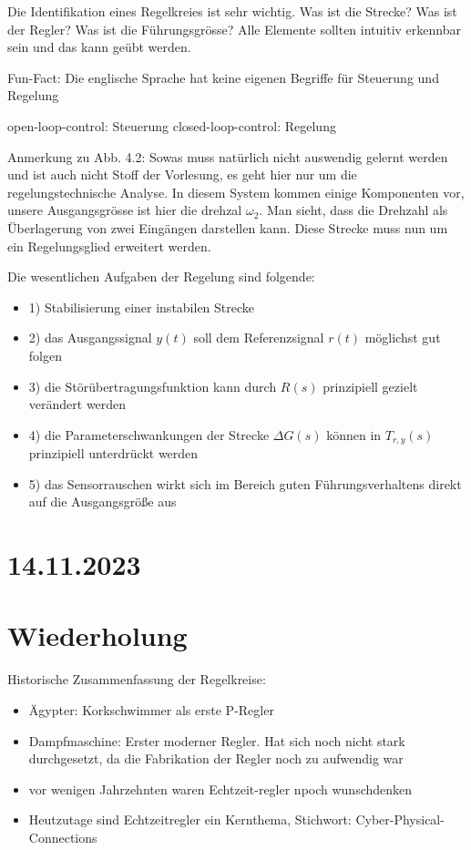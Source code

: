 \documentclass[a4paper]{article}
\begin{document}
Die Identifikation eines Regelkreies ist sehr wichtig. Was ist die Strecke? Was ist der Regler? Was ist die Führungsgrösse? Alle Elemente sollten intuitiv erkennbar sein und das kann geübt werden.

Fun-Fact: Die englische Sprache hat keine eigenen Begriffe für Steuerung und Regelung
\begin{iteimize}
    open-loop-control: Steuerung
    closed-loop-control: Regelung
\end{iteimize}

Anmerkung zu Abb. 4.2: Sowas muss natürlich nicht auswendig gelernt werden und ist auch nicht Stoff der Vorlesung, es geht hier nur um die regelungstechnische Analyse.
In diesem System kommen einige Komponenten vor, unsere Ausgangsgrösse ist hier die drehzal $\omega_{2}$. Man sieht, dass die Drehzahl als Überlagerung von zwei Eingängen darstellen kann. Diese Strecke muss nun um ein Regelungsglied erweitert werden.

Die wesentlichen Aufgaben der Regelung sind folgende:
\begin{itemize}
    \item 1) Stabilisierung einer instabilen Strecke
    \item 2) das Ausgangssignal $y(t)$ soll dem Referenzsignal $r(t)$ möglichst gut folgen
    \item 3) die Störübertragungsfunktion kann durch $R(s)$ prinzipiell gezielt verändert werden
    \item 4) die Parameterschwankungen der Strecke $\Delta G(s)$ können in  $T_{r,y}(s)$ prinzipiell unterdrückt werden
    \item 5) das Sensorrauschen wirkt sich im Bereich guten Führungsverhaltens direkt auf die Ausgangsgröße aus 
\end{itemize}

\section*{14.11.2023}
\section*{Wiederholung}
Historische Zusammenfassung der Regelkreise:
\begin{itemize}
    \item Ägypter: Korkschwimmer als erste P-Regler
    \item Dampfmaschine: Erster moderner Regler. Hat sich noch nicht stark durchgesetzt, da die Fabrikation der Regler noch zu aufwendig war
    \item vor wenigen Jahrzehnten waren Echtzeit-regler npoch wunschdenken
    \item Heutzutage sind Echtzeitregler ein Kernthema, Stichwort: Cyber-Physical-Connections
\end{itemize}
\end{document}

